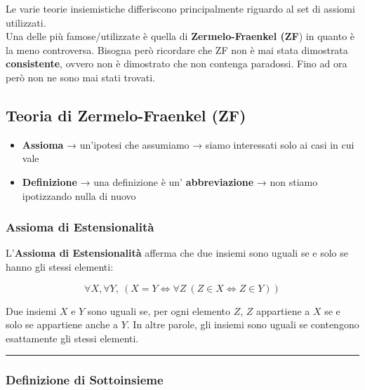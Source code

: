 \documentclass[
  a4paper,
]{article}
\providecommand{\tightlist}{%
  \setlength{\itemsep}{0pt}\setlength{\parskip}{0pt}}
\begin{document}
Le varie teorie insiemistiche differiscono principalmente riguardo al
set di assiomi utilizzati.\\
Una delle più famose/utilizzate è quella di \textbf{Zermelo-Fraenkel
(ZF}) in quanto è la meno controversa. Bisogna però ricordare che ZF non
è mai stata dimostrata \textbf{consistente}, ovvero non è dimostrato che
non contenga paradossi. Fino ad ora però non ne sono mai stati trovati.

\hypertarget{teoria-di-zermelo-fraenkel-zf}{%
\subsection{Teoria di Zermelo-Fraenkel
(ZF)}\label{teoria-di-zermelo-fraenkel-zf}}

\begin{itemize}
\tightlist
\item
  \textbf{Assioma} → un'ipotesi che assumiamo → siamo interessati solo
  ai casi in cui vale
\item
  \textbf{Definizione} → una definizione è un' \textbf{abbreviazione} →
  non stiamo ipotizzando nulla di nuovo
\end{itemize}

\hypertarget{assioma-di-estensionalituxe0}{%
\subsubsection{Assioma di
Estensionalità}\label{assioma-di-estensionalituxe0}}

L'\textbf{Assioma di Estensionalità} afferma che due insiemi sono uguali
se e solo se hanno gli stessi elementi:

\[
\forall X, \forall Y, \ (X = Y \iff \forall Z \ (Z \in X \iff Z \in Y))
\]

Due insiemi \(X\) e \(Y\) sono uguali se, per ogni elemento \(Z\), \(Z\)
appartiene a \(X\) se e solo se appartiene anche a \(Y\). In altre
parole, gli insiemi sono uguali se contengono esattamente gli stessi
elementi.

\par\noindent\rule{\linewidth}{0.4pt}\par\vspace{6pt}

\hypertarget{definizione-di-sottoinsieme}{%
\subsubsection{Definizione di
Sottoinsieme}\label{definizione-di-sottoinsieme}}
\end{document}
